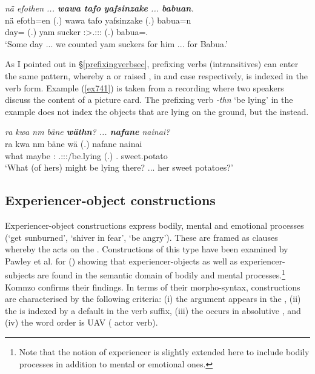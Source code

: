 \begin{exe}
	\ex \emph{nä efothen ... \textbf{wawa tafo} \textbf{yafsinzake} ... \textbf{babuan}.}\\
	\gll nä efoth=en (.) wawa tafo ya{fsi}nzake (.) babua=n\\
	\Indf{} day=\Loc{} (.) yam sucker \Fpl:\Sbj>\Tsg.\Masc:\Io:\Pst:\Ipfv{} (.) babua=\Dat.\Sg{}\\
	\trans `Some day ... we counted yam suckers for him ... for Babua.'\\
	\label{ex577}
\end{exe}

As I pointed out in \S{}\ref{prefixingverbsec}, prefixing verbs (intransitives) can enter the same pattern, whereby a  or raised , in  and  case respectively, is indexed in the verb form. Example (\ref{ex741}) is taken from a recording where two speakers discuss the content of a picture card. The prefixing verb \emph{-thn} `be lying' in the example does not index the objects that are lying on the ground, but the  instead.

\begin{exe}
	\ex \emph{ra kwa nm bäne \textbf{wäthn}? ... \textbf{nafane} nainai?}\\
	\gll ra kwa nm bäne wä (.) nafane nainai\\
	what \Fut{} maybe \Dem:\Med{} \Tsg.\F:\Io:\Nonpast:\Ipfv/be.lying (.) \Tsg.\Poss{} sweet.potato\\
	\trans `What (of hers) might be lying there? ... her sweet potatoes?'\\
	\label{ex741}
\end{exe}

\subsection{Experiencer-object constructions}\label{expobjconstr}

Experiencer-object constructions express bodily, mental and emotional processes (`get sunburned', `shiver in fear', `be angry'). These are framed as  clauses whereby the  acts on the . Constructions of this type have been examined by Pawley et al. for  (\citeyear{Pawley:2000vp}) showing that experiencer-objects as well as experiencer-subjects are found in the semantic domain of bodily and mental processes.\footnote{Note that the notion of experiencer is slightly extended here to include bodily processes in addition to mental or emotional ones.} Komnzo confirms their findings. In terms of their morpho-syntax,  constructions are characterised by the following criteria: (i) the  argument appears in the , (ii) the  is indexed by a default \Tsg{} in the verb suffix, (iii) the  occurs in absolutive , and (iv) the word order is UAV ( actor verb).\\


